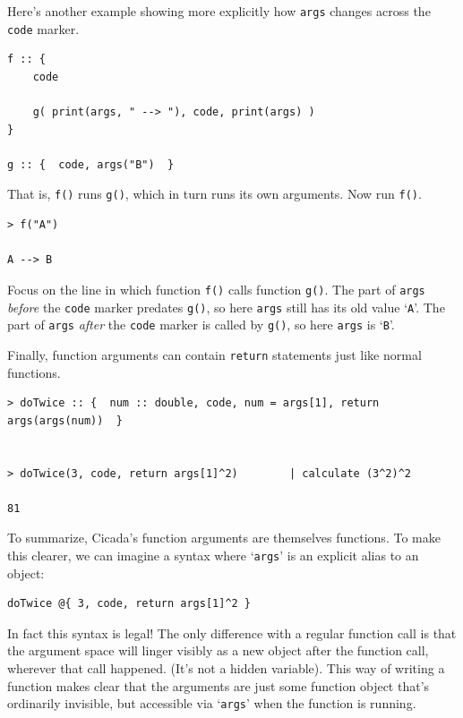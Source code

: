 \documentclass{article}
\newenvironment{code}{
       \begin{list}{}{
               \setlength{\leftmargin}{.4in}
               \setlength{\rightmargin}{0in}
               \setlength{\topsep}{.2in}
       }
       \small
       \item[] }
       { \end{list}   }
\begin{document}
Here's another example showing more explicitly how \texttt{args} changes across the \texttt{code} marker.

\begin{code} \begin{verbatim}
f :: {
    code
    
    g( print(args, " --> "), code, print(args) )
}

g :: {  code, args("B")  }
\end{verbatim} \end{code}

\noindent That is, \texttt{f()} runs \texttt{g()}, which in turn runs its own arguments.  Now run \verb#f()#.

\begin{code} \begin{verbatim}
> f("A")

A --> B
\end{verbatim} \end{code}

\noindent Focus on the line in which function \verb#f()# calls function \verb#g()#.  The part of \verb#args# \emph{before} the \verb#code# marker predates \verb#g()#, so here \texttt{args} still has its old value `\texttt{A}'.  The part of \verb#args# \emph{after} the \verb#code# marker is called by \texttt{g()}, so here \texttt{args} is `\texttt{B}'.

Finally, function arguments can contain \verb#return# statements just like normal functions.

\begin{code} \begin{verbatim}
> doTwice :: {  num :: double, code, num = args[1], return args(args(num))  }


> doTwice(3, code, return args[1]^2)        | calculate (3^2)^2

81
\end{verbatim} \end{code}

To summarize, Cicada's function arguments are themselves functions.  To make this clearer, we can imagine a syntax where `\verb#args#' is an explicit alias to an object:

\begin{code} \begin{verbatim}
doTwice @{ 3, code, return args[1]^2 }
\end{verbatim} \end{code}

\noindent In fact this syntax is legal!  The only difference with a regular function call is that the argument space will linger visibly as a new object after the function call, wherever that call happened.  (It's not a hidden variable).  This way of writing a function makes clear that the arguments are just some function object that's ordinarily invisible, but accessible via `\verb#args#' when the function is running.
\end{document}
